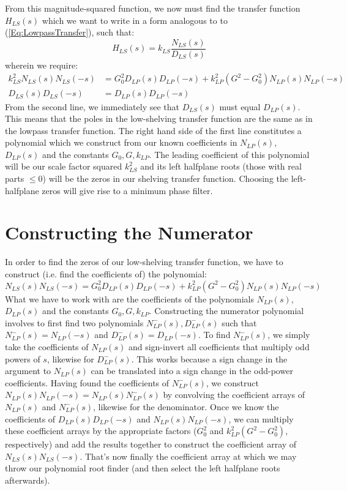 From this magnitude-squared function, we now must find the transfer function $H_{LS}(s)$ which we want to write in a form analogous to to (\ref{Eq:LowpassTransfer}), such that:
\begin{equation}
H_{LS}(s) = k_{LS} \frac{N_{LS}(s)}{D_{LS}(s)}
\end{equation}
wherein we require:
\begin{equation}
\label{Eq:LowshelfNumAndDen}
\begin{aligned}
 k_{LS}^2 N_{LS}(s) N_{LS}(-s) &= G_0^2 D_{LP}(s) D_{LP}(-s) + k_{LP}^2(G^2-G_0^2)N_{LP}(s) N_{LP}(-s) \\
 D_{LS}(s) D_{LS}(-s)          &= D_{LP}(s) D_{LP}(-s)
\end{aligned}
\end{equation}
From the second line, we immediately see that $D_{LS}(s)$ must equal $D_{LP}(s)$. This means that the poles in the low-shelving transfer function are the same as in the lowpass transfer function. The right hand side of the first line constitutes a polynomial which we construct from our known coefficients in $N_{LP}(s)$, $D_{LP}(s)$ and the constants $G_0, G, k_{LP}$. The leading coefficient of this polynomial will be our scale factor squared $k_{LS}^2$ and its left halfplane roots (those with real parts $\leq 0$) will be the zeros in our shelving transfer function. Choosing the left-halfplane zeros will give rise to a minimum phase filter. 

\section{Constructing the Numerator}
In order to find the zeros of our low-shelving transfer function, we have to construct (i.e. find the coefficients of) the polynomial: 
\begin{equation}
 N_{LS}(s) N_{LS}(-s) = G_0^2 D_{LP}(s) D_{LP}(-s) + k_{LP}^2(G^2-G_0^2)N_{LP}(s) N_{LP}(-s)
\end{equation}
What we have to work with are the coefficients of the polynomials $N_{LP}(s)$, $D_{LP}(s)$ and the constants $G_0, G, k_{LP}$. Constructing the numerator polynomial involves to first find two polynomials $N_{LP}^-(s), D_{LP}^-(s)$ such that $N_{LP}^-(s) = N_{LP}(-s)$ and $D_{LP}^-(s) = D_{LP}(-s)$. To find $N_{LP}^-(s)$, we simply take the coefficients of $N_{LP}(s)$ and sign-invert all coefficients that multiply odd powers of $s$, likewise for $D_{LP}^-(s)$. This works because a sign change in the argument to $N_{LP}(s)$ can be translated into a sign change in the odd-power coefficients. Having found the coefficients of $N_{LP}^-(s)$, we construct $N_{LP}(s) N_{LP}(-s) = N_{LP}(s) N_{LP}^-(s)$ by convolving the coefficient arrays of $N_{LP}(s)$ and $N_{LP}^-(s)$, likewise for the denominator. Once we know the coefficients of $D_{LP}(s) D_{LP}(-s)$ and $N_{LP}(s) N_{LP}(-s)$, we can multiply these coefficient arrays by the appropriate factors ($G_0^2$ and $k_{LP}^2(G^2-G_0^2)$, respectively) and add the results together to construct the coefficient array of $N_{LS}(s) N_{LS}(-s)$. That's now finally the coefficient array at which we may throw our polynomial root finder (and then select the left halfplane roots afterwards).

